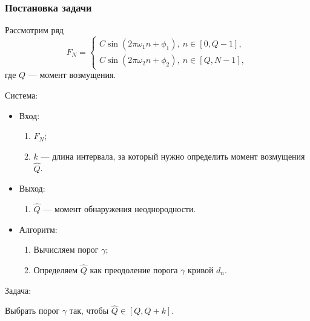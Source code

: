 \documentclass[11pt]{beamer}
\begin{document}
	\begin{frame}
		\frametitle{Постановка задачи}
		Рассмотрим ряд 
		\begin{equation*} 
			F_N = 
			\begin{cases} 
				C\sin(2\pi\omega_1 n + \phi_1),\ n \in [0, Q-1], \\ 
				C\sin(2\pi\omega_2 n + \phi_2),\ n \in [Q, N-1], 
			\end{cases} 
		\end{equation*}
		где $ Q $ --- момент возмущения. 
		
		
		Система: 
		
		\begin{itemize}
			\item Вход:
			\begin{enumerate}
				\item $ F_N $;
				\item $ k $ --- длина интервала, за который нужно определить момент возмущения $ \hat{Q} $.
			\end{enumerate}
			\item Выход:
			\begin{enumerate}
				\item $ \hat{Q} $ --- момент обнаружения неоднородности.
			\end{enumerate}
			\item Алгоритм:
			\begin{enumerate}
				\item Вычисляем порог $ \gamma $;
				\item Определяем $ \hat{Q} $ как преодоление порога $ \gamma $ кривой $ d_n $.
			\end{enumerate}
		\end{itemize}
		Задача:
		
		Выбрать порог $ \gamma $ так, чтобы $ \hat{Q} \in [Q, Q+k] $.
	\end{frame}
	
\end{document}
